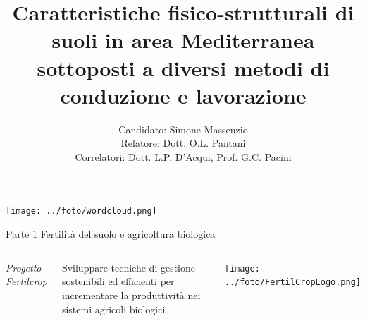 \documentclass[xcolor={usenames, table, x11names}, final, 10pt]{beamer}
\title[25 anni di conduzione biologica in area Mediterranea: uno
studio di fisica del suolo] %
{ Caratteristiche fisico-strutturali di suoli in area Mediterranea
  sottoposti a diversi metodi di conduzione e lavorazione}
\author[Simone Massenzio]{ 
  Candidato: Simone Massenzio \\
  Relatore: Dott. O.L. Pantani\\
  \vspace{0.1cm}
  Correlatori:
  Dott. L.P. D'Acqui, Prof. G.C. Pacini}
\institute[] { \emph{Dipartimento di Scienze della Produzioni Animali e
    dell'Ambiente\\
    Universit\`a degli Studi di Firenze - UniFI\\}
  
}
\date{\displaydate{date}}
\begin{document}
{\1
  \begin{frame}[noframenumbering]%
    \titlepage
  \end{frame}}




\begin{frame}
  \vspace{2cm}
  
  \centering
  \texttt{[image: ../foto/wordcloud.png]}
  
\end{frame}

\begin{frame}{Parte 1 \small{Fertilità del suolo e agricoltura biologica}}
  \begin{columns}
    
    \emph{Progetto Fertilcrop}
    
    Sviluppare tecniche di gestione sostenibili ed efficienti per
    incrementare la produttività nei sistemi agricoli biologici
    
    
    \centering
    \texttt{[image: ../foto/FertilCropLogo.png]}
    
  \end{columns}
\end{frame}
\end{document}
